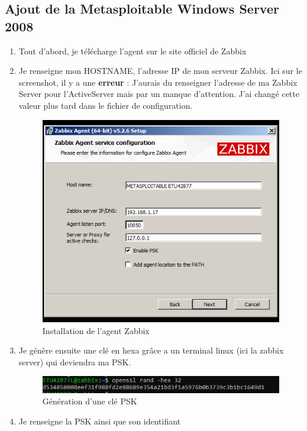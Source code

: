 \documentclass[a4paper]{article}
\begin{document}
\subsection{Ajout de la Metasploitable Windows Server 2008}
\begin{enumerate}
  \item Tout d'abord, je télécharge l'agent sur le site officiel de Zabbix
  \item Je renseigne mon HOSTNAME, l'adresse IP de mon serveur Zabbix. Ici sur le screenshot, il y a une \textbf{erreur} : J'aurais du renseigner l'adresse de ma Zabbix Server pour l'ActiveServer
  mais par un manque d'attention. J'ai changé cette valeur plus tard dans le fichier de configuration.
  \begin{figure}[H]
    \centering
    \includegraphics[width=11cm]{images/Rapport/2k8/1.png}
    \caption{Installation de l'agent Zabbix}
  \end{figure}
  \item Je génère ensuite une clé en hexa grâce a un terminal linux (ici la zabbix server) qui deviendra ma PSK.
  \begin{figure}[H]
    \centering
    \includegraphics[width=12cm]{images/Rapport/2k8/2.png}
    \caption{Génération d'une clé PSK}
  \end{figure}
  \item Je renseigne la PSK ainsi que son identifiant
  \begin{figure}[H]
    \centering

\end{figure}
\end{enumerate}
\end{document}
